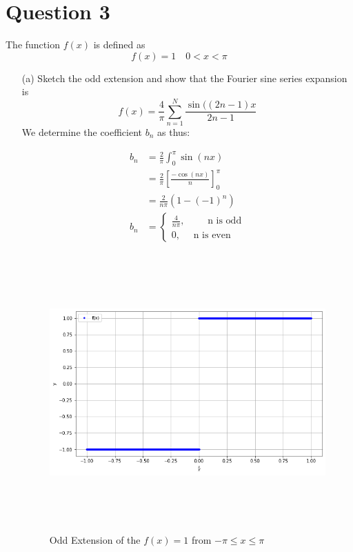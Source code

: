 \documentclass[12pt,a4paper]{article}
\begin{document}
\section*{Question 3}
The function $f(x)$ is defined as
\begin{equation}
    f(x) =1 \quad 0<x<\pi  
    \label{eq:05}
\end{equation}
\begin{enumerate}
	\item[(a)] Sketch the odd extension and show that the Fourier sine series expansion is
		\begin{equation}
			\label{eqn:6}
			f(x)=\frac{4}{\pi}\sum_{n=1}^{N}\frac{\sin((2n-1)x}{2n-1}
		\end{equation}
		We determine the coefficient $b_n$ as thus:
		
		\begin{align*}
				b_n &=\frac{2}{\pi}\int_{0}^{\pi}\sin(nx)\\
				&=\frac{2}{\pi}\left[\frac{-\cos(nx)}{n}\right]_{0}^{\pi}\\
				&=\frac{2}{n\pi}\left(1-(-1)^n\right)\\
				b_n&=\begin{cases}
					\frac{4}{n\pi}, \quad   \quad \text{  n is odd}\\
				0 ,  \quad \text{ n is even}
				\end{cases}
		\end{align*}
		\begin{figure}[!h]
			\includegraphics[width=430pt,  height=300pt]{./graphics/q3a1.png}
			\caption{Odd Extension of the $f(x)=1$ from $-\pi \leq x  \leq \pi$}
		\end{figure}
			

\end{enumerate}
\end{document}
